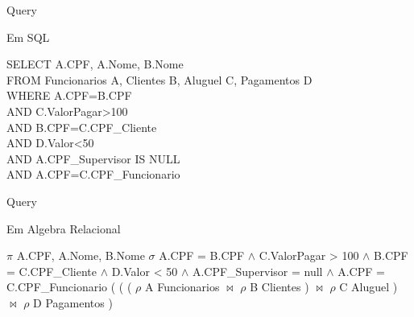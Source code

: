 \documentclass[aspectratio=169]{beamer}
\begin{document}
  \begin{frame}{Query}
    
    Em SQL
    
    \begin{flushleft}
      SELECT A.CPF, A.Nome, B.Nome \\
      FROM Funcionarios A, Clientes B, Aluguel C, Pagamentos D \\
      WHERE A.CPF=B.CPF \\
      AND C.ValorPagar>100 \\
      AND B.CPF=C.CPF\_Cliente \\
      AND D.Valor<50 \\
      AND A.CPF\_Supervisor IS NULL \\
      AND A.CPF=C.CPF\_Funcionario  \\
    \end{flushleft}

  \end{frame}
  \begin{frame}{Query}

    Em Algebra Relacional
    \begin{flushleft}
      $\pi$ A.CPF, A.Nome, B.Nome $\sigma$ A.CPF = B.CPF $\wedge$ C.ValorPagar > 100 $\wedge$ B.CPF = C.CPF\_Cliente $\wedge$ D.Valor < 50 $\wedge$ A.CPF\_Supervisor = null $\wedge$ A.CPF = C.CPF\_Funcionario ( ( ( $\rho$ A Funcionarios $\bowtie$ $\rho$ B Clientes ) $\bowtie$ $\rho$ C Aluguel ) $\bowtie$ $\rho$ D Pagamentos ) 
    \end{flushleft}
  \end{frame}
\end{document}
